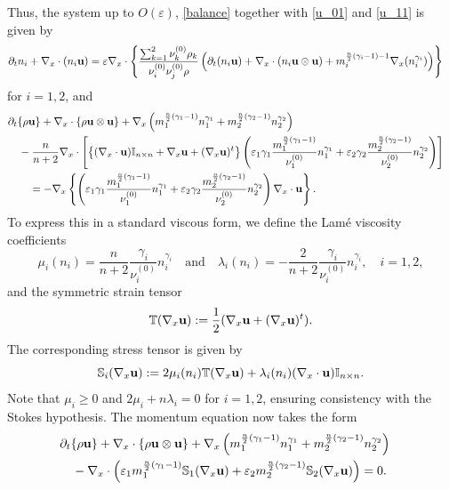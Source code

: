 \documentclass[10pt,reqno]{amsart}
\numberwithin{equation}{section}
\newcommand{\T}{\mathbb T}
\newcommand{\e}{\varepsilon}
\newcommand{\lt}{\left}
\newcommand{\rt}{\right}
\newcommand{\pa}{\partial}
\begin{document}
Thus, the system up to $O(\varepsilon)$, \eqref{balance} together with \eqref{u_01} and \eqref{u_11} is given by
\begin{align*}
&\pa_t n_i+\nabla_x\cdot (n_i {\bf{u}})=\varepsilon\nabla_x \cdot  \left\{\frac{\sum_{k=1}^2\nu_k^{(0)}\rho_k}{\nu_{i}^{(0)}\nu_{j}^{(0)}\rho }\left(    \pa_t(n_i {\bf{u}}) +\nabla_x\cdot (n_i {\bf{u}}\otimes {\bf{u}}) + m_i^{\frac n2(\gamma_i - 1)-1}  \nabla_x (n_i^{\gamma_i}) \right) \right\}
\end{align*}
for $i=1,2$, and
\begin{align*}
&\pa_t\{\rho {\bf{u}}\}+ \nabla_x\cdot \left\{\rho  {\bf{u}}\otimes {\bf{u}} \right\}+\nabla_x \left( m_1^{\frac{n}{2}(\gamma_1-1)}n_1^{\gamma_1}+m_2^{\frac{n}{2}(\gamma_2-1)}n_2^{\gamma_2} \right)\cr 
&\quad -\frac{n}{n+2}\nabla_x \cdot \lt[ \left\{ (\nabla_x\cdot {\bf{u}}) \mathbb{I}_{n\times n} +\nabla_x {\bf{u}}+(\nabla_x{\bf{u}})^t\right\}\left(\e_1\gamma_1\frac{m_1^{\frac n2(\gamma_1 - 1)}  }{\nu_1^{(0)}} n_1^{\gamma_1}+\e_2\gamma_2\frac{m_2^{\frac n2(\gamma_2 - 1)}  }{\nu_2^{(0)}} n_2^{\gamma_2}\right)\rt]\cr
&\qquad =-\nabla_x \left\{\left( \e_1\gamma_1 \frac{m_1^{\frac n2(\gamma_1 - 1)}  }{\nu_1^{(0)}} n_1^{\gamma_1}+\e_2 \gamma_2 \frac{m_2^{\frac n2(\gamma_2 - 1)}  }{\nu_2^{(0)}} n_2^{\gamma_2} \right) \nabla_x\cdot {\bf{u}}  \right\}. 
\end{align*}
To express this in a standard viscous form, we define the Lam\'e viscosity coefficients
\[
\mu_i(n_i) = \frac{n }{n+2}\frac{\gamma_i}{\nu_i^{(0)}}  n_i^{\gamma_i} \quad \mbox{and} \quad \lambda_i(n_i) = -\frac{2 }{n+2}\frac{\gamma_i}{\nu_i^{(0)}} n_i^{\gamma_i}, \quad i =1,2,
\]
and the symmetric strain tensor
\[
\T(\nabla_x {\bf{u}}) := \frac12 (\nabla_x {\bf{u}} + (\nabla_x {\bf{u}})^t).
\]
The corresponding stress tensor is given by
\[
\mathbb{S}_i(\nabla_x {\bf{u}}):= 2\mu_i(n_i) \T(\nabla_x {\bf{u}}) + \lambda_i (n_i) (\nabla_x \cdot {\bf{u}}) \mathbb{I}_{n\times n}.
\]
Note that $\mu_i \geq 0$ and $2\mu_i + n \lambda_i = 0$ for $i=1,2$, ensuring consistency with the Stokes hypothesis. The momentum equation now takes the form
\begin{align*}
&\pa_t\{\rho {\bf{u}}\}+ \nabla_x\cdot \left\{\rho {\bf{u}}\otimes {\bf{u}} \right\}+\nabla_x \left( m_1^{\frac{n}{2}(\gamma_1-1)}n_1^{\gamma_1}+m_2^{\frac{n}{2}(\gamma_2-1)}n_2^{\gamma_2} \right)\cr 
&\quad - \nabla_x \cdot \lt(\e_1 m_1^{\frac n2(\gamma_1 - 1)}\mathbb{S}_1(\nabla_x {\bf{u}}) + \e_2  m_2^{\frac n2(\gamma_2 - 1)}  \mathbb{S}_2(\nabla_x {\bf{u}})\rt) = 0.
\end{align*}
\end{document}
